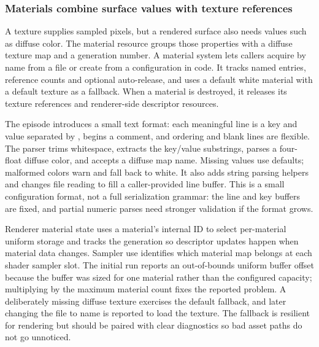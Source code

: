 \subsubsection{Materials combine surface values with texture references}\label{06-engine-ii-ch025-materials-combine-surface-values-with-texture-references}

\hypertarget{06-engine-ii-ch025-materials-combine-surface-values-with-texture-references}{}

A texture supplies sampled pixels, but a rendered surface also needs values such as diffuse color. The material resource groups those properties with a diffuse texture map and a generation number. A material system lets callers acquire by name from a file or create from a configuration in code. It tracks named entries, reference counts and optional auto-release, and uses a default white material with a default texture as a fallback. When a material is destroyed, it releases its texture references and renderer-side descriptor resources.

The episode introduces a small  text format: each meaningful line is a key and value separated by \BookInlineCode{=}, \BookInlineCode{\#} begins a comment, and ordering and blank lines are flexible. The parser trims whitespace, extracts the key/value substrings, parses a four-float diffuse color, and accepts a diffuse map name. Missing values use defaults; malformed colors warn and fall back to white. It also adds string parsing helpers and changes file reading to fill a caller-provided line buffer. This is a small configuration format, not a full serialization grammar: the line and key buffers are fixed, and partial numeric parses need stronger validation if the format grows.

Renderer material state uses a material's internal ID to select per-material uniform storage and tracks the generation so descriptor updates happen when material data changes. Sampler use identifies which material map belongs at each shader sampler slot. The initial run reports an out-of-bounds uniform buffer offset because the buffer was sized for one material rather than the configured capacity; multiplying by the maximum material count fixes the reported problem. A deliberately missing diffuse texture exercises the default fallback, and later changing the file to name  is reported to load the texture. The fallback is resilient for rendering but should be paired with clear diagnostics so bad asset paths do not go unnoticed.

